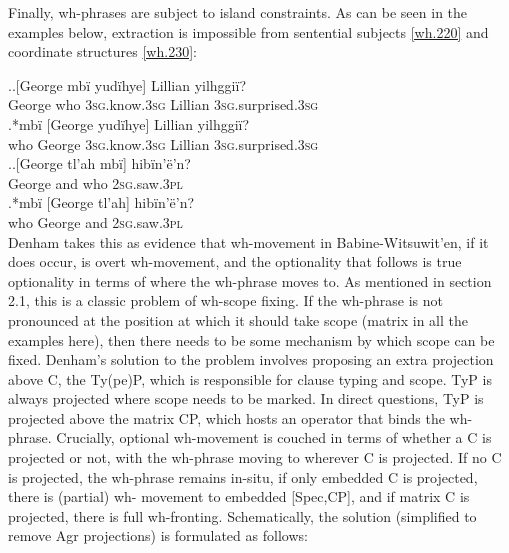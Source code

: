 \documentclass[charis]{glossa}
\begin{document}
Finally, wh-phrases are subject to island constraints. As can be seen in the examples below, extraction is impossible from sentential subjects \ref{wh.220} and coordinate structures \ref{wh.230}:

\ex.\label{wh.220}\ag.{}[George mb\"i yud\"ihye] Lillian yilhggi\"i?\\
   George who \textsc{3sg}.know.\textsc{3sg} Lillian \textsc{3sg}.surprised.\textsc{3sg}\\
   \bg.*mb\"i [George yud\"ihye] Lillian yilhggi\"i?\\
   who George \textsc{3sg}.know.\textsc{3sg} Lillian \textsc{3sg}.surprised.\textsc{3sg}\\

\ex.\label{wh.230}\ag.{}[George tl'ah mb\"i] hib\"in'\"e'n?\\
   George and who \textsc{2sg}.saw.\textsc{3pl}\\
   \bg.*mb\"i [George tl'ah] hib\"in'\"e'n?\\
   who George and \textsc{2sg}.saw.\textsc{3pl}\\

Denham takes this as evidence that wh-movement in Babine-Witsuwit'en, if it does occur, is overt wh-movement, and the optionality that follows is true optionality in terms of where the wh-phrase moves to. As mentioned in section 2.1, this is a classic problem of wh-scope fixing. If the wh-phrase is not pronounced at the position at which it should take scope (matrix in all the examples here), then there needs to be some mechanism by which scope can be fixed. Denham's solution to the problem involves proposing an extra projection above C, the Ty(pe)P, which is responsible for clause typing and scope. TyP is always projected where scope needs to be marked. In direct questions, TyP is projected above the matrix CP, which hosts an operator that binds the wh-phrase. Crucially, optional wh-movement is couched in terms of whether a C is projected or not, with the wh-phrase moving to wherever C is projected. If no C is projected, the wh-phrase remains in-situ, if only embedded C is projected, there is (partial) wh- movement to embedded [Spec,CP], and if matrix C is projected, there is full wh-fronting. Schematically, the solution (simplified to remove Agr projections) is formulated as follows:
\end{document}
